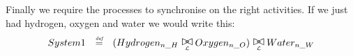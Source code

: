 \documentclass{article}
\begin{document}
Finally we require the processes to synchronise on the right
activities.  If we just had hydrogen, oxygen and water we would write
this:
\begin{displaymath}
\begin{array}{rcl}
  System1 &\rmdef& (Hydrogen_{n\_H}  \sync{\mathcal{L}}  Oxygen_{n\_O})
                     \sync{\mathcal{L}}  Water_{n\_W}
\end{array}
\end{displaymath}
\end{document}
